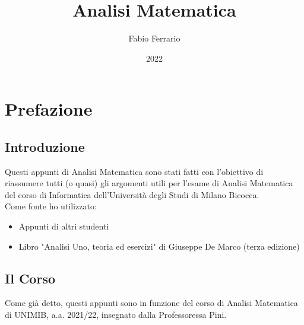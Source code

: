 \documentclass[12pt, a4paper, openany]{book}
\begin{document}
\title{Analisi Matematica}
\author{Fabio Ferrario}
\date{2022}
\maketitle

\tableofcontents

\chapter*{Prefazione}
\section{Introduzione}
Questi appunti di Analisi Matematica sono stati fatti con l'obiettivo di riassumere tutti (o quasi) gli argomenti utili per l'esame di Analisi Matematica del corso di Informatica dell'Università degli Studi di Milano Bicocca.
\\Come fonte ho utilizzato:
\begin{itemize}
	\item Appunti di altri studenti
	\item Libro "Analisi Uno, teoria ed esercizi" di Giuseppe De Marco (terza edizione)
\end{itemize}
\section*{Il Corso}
Come già detto, questi appunti sono in funzione del corso di Analisi Matematica di UNIMIB, a.a. 2021/22, insegnato dalla Professoressa Pini.
\end{document}
